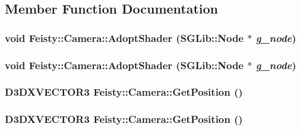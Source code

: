 \subsection{Member Function Documentation}
\hypertarget{class_feisty_1_1_camera_a8eb2963d22386fad3a2beba4e3d1871e}{
\subsubsection[{AdoptShader}]{\setlength{\rightskip}{0pt plus 5cm}void Feisty::Camera::AdoptShader (SGLib::Node $\ast$ {\em g\_\-node})}}
\label{class_feisty_1_1_camera_a8eb2963d22386fad3a2beba4e3d1871e}
\hypertarget{class_feisty_1_1_camera_a8eb2963d22386fad3a2beba4e3d1871e}{
\subsubsection[{AdoptShader}]{\setlength{\rightskip}{0pt plus 5cm}void Feisty::Camera::AdoptShader (SGLib::Node $\ast$ {\em g\_\-node})}}
\label{class_feisty_1_1_camera_a8eb2963d22386fad3a2beba4e3d1871e}
\hypertarget{class_feisty_1_1_camera_aa4384bf9913be09d286fbdf7c318f4f5}{
\subsubsection[{GetPosition}]{\setlength{\rightskip}{0pt plus 5cm}D3DXVECTOR3 Feisty::Camera::GetPosition ()}}
\label{class_feisty_1_1_camera_aa4384bf9913be09d286fbdf7c318f4f5}
\hypertarget{class_feisty_1_1_camera_aa4384bf9913be09d286fbdf7c318f4f5}{
\subsubsection[{GetPosition}]{\setlength{\rightskip}{0pt plus 5cm}D3DXVECTOR3 Feisty::Camera::GetPosition ()}}

